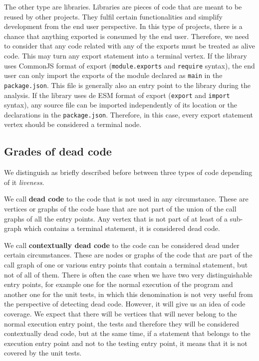 \documentclass{uvamscse}
\begin{document}
The other type are libraries. Libraries are pieces of code that are meant to be reused by other projects. They fulfil certain functionalities and simplify development from the end user perspective. In this type of projects, there is a chance that anything exported is consumed by the end user. Therefore, we need to consider that any code related with any of the exports must be treated as alive code. This may turn any export statement into a terminal vertex. If the library uses CommonJS format of export (\texttt{module.exports} and \texttt{require} syntax), the end user can only import the exports of the module declared as \texttt{main} in the \texttt{package.json}. This file is generally also an entry point to the library during the analysis. If the library uses de ESM format of export (\texttt{export} and \texttt{import} syntax), any source file can be imported independently of its location or the declarations in the \texttt{package.json}. Therefore, in this case, every export statement vertex should be considered a terminal node.

\subsection{Grades of dead code}
We distinguish as briefly described before between three types of code depending of it \textit{liveness}. 

We call \textbf{dead code} to the code that is not used in any circumstance. These are vertices or graphs of the code base that are not part of the union of the call graphs of all the entry points. Any vertex that is not part of at least of a sub-graph which contains a terminal statement, it is considered dead code.

We call \textbf{contextually dead code} to the code can be considered dead under certain circumstances. These are nodes or graphs of the code that are part of the call graph of one or various entry points that contain a terminal statement, but not of all of them. There is often the case when we have two very distinguishable entry points, for example one for the normal execution of the program and another one for the unit tests, in which this denomination is not very useful from the perspective of detecting dead code. However, it will give us an idea of code coverage. We expect that there will be vertices that will never belong to the normal execution entry point, the tests and therefore they will be considered contextually dead code, but at the same time, if a statement that belongs to the execution entry point and not to the testing entry point, it means that it is not covered by the unit tests.
 
\end{document}
